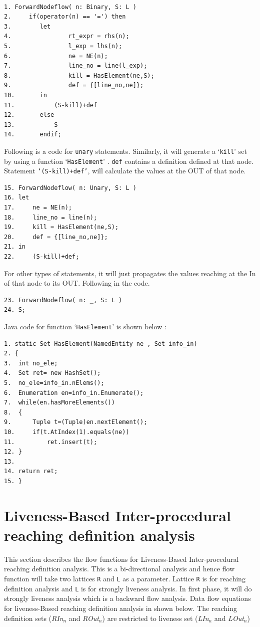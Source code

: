 \documentclass[11pt,a4paper,openright]{report}
\begin{document}
\begin{lstlisting}[]  % Start your code-block

1. ForwardNodeflow( n: Binary, S: L )
2.     if(operator(n) == '=') then   
3.        let        
4.                rt_expr = rhs(n);
5.                l_exp = lhs(n);
6.                ne = NE(n);
7.                line_no = line(l_exp);
8.                kill = HasElement(ne,S); 
9.                def = {[line_no,ne]};
10.       in
11.       	  (S-kill)+def        
12.       else
13.        	  S
14.       endif;
\end{lstlisting}

Following is a code for \texttt{unary} statements. Similarly, it will generate a `\texttt{kill}' set by using a function `\texttt{HasElement}' 
. \texttt{def} contains a definition defined at that node. Statement \texttt{`(S-kill)+def'}, will calculate the values at the OUT of that
node.
\begin{lstlisting}[]
15. ForwardNodeflow( n: Unary, S: L )
16.	let
17.		ne = NE(n);
18.		line_no = line(n);
19.		kill = HasElement(ne,S);
20.		def = {[line_no,ne]};
21.	in
22.		(S-kill)+def;
\end{lstlisting}

For other types of statements, it will just propagates the values reaching at the In of that node to its OUT. Following in the code.

\begin{lstlisting}[]
23. ForwardNodeflow( n: _, S: L ) 
24.	S;
\end{lstlisting}

Java code for function `\texttt{HasElement}' is shown below :
\begin{lstlisting}
1. static Set HasElement(NamedEntity ne , Set info_in)
2. {
3.	int no_ele;
4.	Set ret= new HashSet();
5.	no_ele=info_in.nElems();
6.	Enumeration en=info_in.Enumerate();
7.	while(en.hasMoreElements())
8.	{
9.		Tuple t=(Tuple)en.nextElement();
10.		if(t.AtIndex(1).equals(ne))
11.			ret.insert(t);
12.	}	
13.
14.	return ret;
15. }

\end{lstlisting}

\section{Liveness-Based Inter-procedural reaching definition analysis}
This section describes the flow functions for Liveness-Based Inter-procedural reaching definition analysis. This is a bi-directional
analysis and hence flow function will take two lattices \texttt{R} and \texttt{L} as a parameter. Lattice \texttt{R} is for reaching definition analysis and
\texttt{L} is for strongly liveness analysis. In first phase, it will do strongly liveness analysis which is a backward flow analysis.
Data flow equations for liveness-Based reaching definition analysis in shown below. The reaching definition sets (\textit{RIn}$_n$ and \textit{ROut}$_n$) are restricted 
to liveness set (\textit{LIn}$_n$ and \textit{LOut}$_n$)
\end{document}
